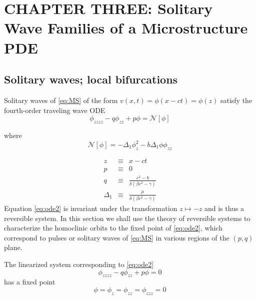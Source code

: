 \chapter{CHAPTER THREE: Solitary Wave Families of a Microstructure PDE } \label{chapter_3}

\section{Solitary waves; local bifurcations}


Solitary waves of \eqref{eq:MS} of the form 
$v(x,t) = \phi\left(x - c t\right) = \phi\left(z\right)$
 satisfy the fourth-order traveling wave ODE
\begin{equation} \label{eq:ode2} \phi_{zzzz} - q \phi_{zz} + p \phi = \mathcal{N}[\phi]
\end{equation}

where 
\begin{equation}
\mathcal{N}\left[\phi\right] = -\Delta_1 \phi_z^2 - b \Delta_1 \phi \phi_{zz}
\end{equation}

\begin{subequations}
\begin{eqnarray}
z &\equiv& x - c t\\
p &\equiv& 0\label{eq:pdef} \\
q &\equiv & \frac{c^2 - b}{\delta\left(\beta c^2 - \gamma\right)} 
\label{eq:qdef2} \\
\Delta_1 &\equiv& \frac{\mu}{ \delta\left( \beta c^2 - \gamma\right) }\label{eq:deltadef} 
\end{eqnarray}
\end{subequations}
Equation \eqref{eq:ode2} is invariant under the transformation $ z \mapsto -z $ and is thus a reversible system. In this section we shall
use the theory of reversible systems to characterize the homoclinic orbits to the fixed point of \eqref{eq:ode2}, which correspond to pulses
or solitary waves of \eqref{eq:MS} in various regions of the $(p,q)$ plane.

The linearized system corresponding to \eqref{eq:ode2}
\begin{equation}
 \label{eq:linode2} \phi_{zzzz} - q \phi_{zz} + p \phi = 0
\end{equation}
has a fixed point \begin{equation}\label{eq:fp2} \phi = \phi_z = \phi_{zz} = \phi_{zzz} = 0 \end{equation}


